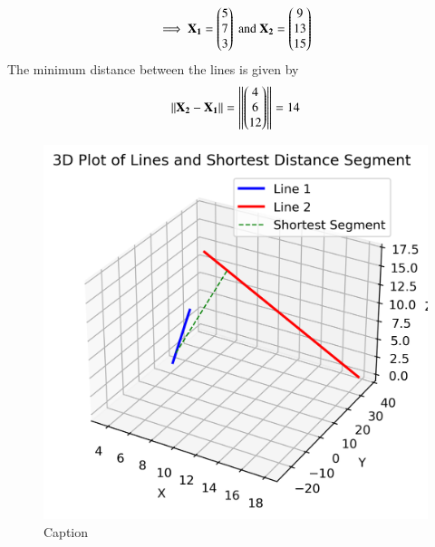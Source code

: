 \documentclass[journal]{IEEEtran}
\begin{document}
\begin{align}
    \implies \mathbf{X_1}=\begin{pmatrix}5\\7\\3\end{pmatrix} \text{ and }\mathbf{X_2}=\begin{pmatrix}9\\13\\15\end{pmatrix}\\
\end{align}
The minimum distance between the lines is given by
\begin{align}
    \left\lVert\mathbf{X_2-X_1}\right\rVert=\left\lVert\begin{pmatrix}4\\6\\12\end{pmatrix}\right\rVert=14
\end{align} 
\begin{figure}[h!]
    \centering
    \includegraphics[width=0.5\columnwidth]{figs/01.png}
    \caption{Caption}
    \label{fig:placeholder}
\end{figure}
\end{document}
